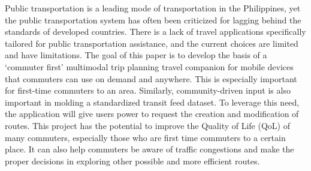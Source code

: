 \documentclass{icsthesis}
\begin{document}
\begin{frontmatter}
\begin{abstractwithpageno}
		Public transportation is a leading mode of transportation in the Philippines, yet the public transportation system has often been criticized for lagging behind the standards of developed countries.
There is a lack of travel applications specifically tailored for public transportation assistance, and the current choices are limited and have limitations.
The goal of this paper is to develop the basis of a `commuter first' multimodal trip planning travel companion for mobile devices that commuters can use on demand and anywhere.
This is especially important for first-time commuters to an area.
Similarly, community-driven input is also important in molding a standardized transit feed dataset.
To leverage this need, the application will give users power to request the creation and modification of routes.
This project has the potential to improve the Quality of Life (QoL) of many commuters, especially those who are first time commuters to a certain place.
It can also help commuters be aware of traffic congestions and make the proper decisions in exploring other possible and more efficient routes. 

        \end{abstractwithpageno}

	\end{frontmatter}
	
\end{document}
